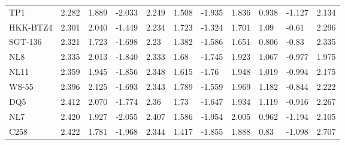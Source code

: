 \begin{tabular}{lrrrllllllr}
           TP1 &                  2.282 &                       1.889 &                      -2.033 &                 2.249 &                      1.508 &                     -1.935 &               1.836 &                    0.938 &                   -1.127 & 2.134 \\
      HKK-BTZ4 &                  2.301 &                       2.040 &                      -1.449 &                 2.234 &                      1.723 &                     -1.324 &               1.701 &                     1.09 &                    -0.61 & 2.296 \\
       SGT-136 &                  2.321 &                       1.723 &                      -1.698 &                  2.23 &                      1.382 &                     -1.586 &               1.651 &                    0.806 &                    -0.83 & 2.335 \\
           NL8 &                  2.335 &                       2.013 &                      -1.840 &                 2.333 &                       1.68 &                     -1.745 &               1.923 &                    1.067 &                   -0.977 & 1.975 \\
          NL11 &                  2.359 &                       1.945 &                      -1.856 &                 2.348 &                      1.615 &                      -1.76 &               1.948 &                    1.019 &                   -0.994 & 2.175 \\
         WS-55 &                  2.396 &                       2.125 &                      -1.693 &                 2.343 &                      1.789 &                     -1.559 &               1.969 &                    1.182 &                   -0.844 & 2.222 \\
           DQ5 &                  2.412 &                       2.070 &                      -1.774 &                  2.36 &                       1.73 &                     -1.647 &               1.934 &                    1.119 &                   -0.916 & 2.267 \\
           NL7 &                  2.420 &                       1.927 &                      -2.055 &                 2.407 &                      1.586 &                     -1.954 &               2.005 &                    0.962 &                   -1.194 & 2.105 \\
          C258 &                  2.422 &                       1.781 &                      -1.968 &                 2.344 &                      1.417 &                     -1.855 &               1.888 &                     0.83 &                   -1.098 & 2.707 \\

\end{tabular}
